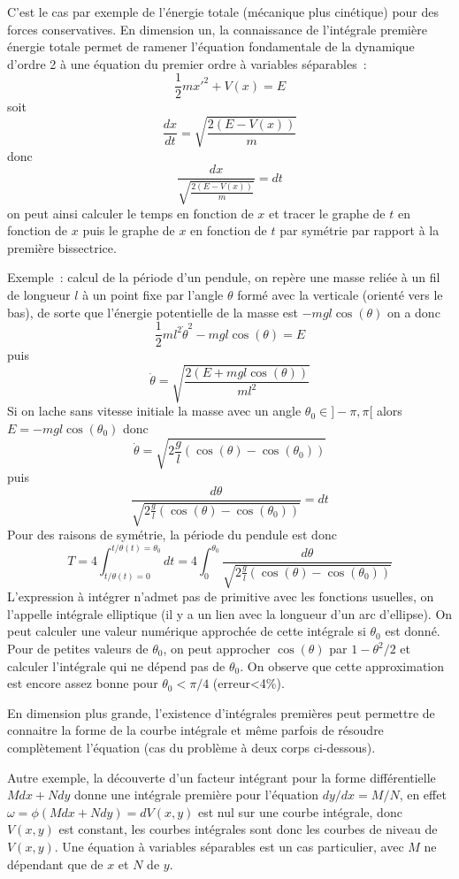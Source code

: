 \documentclass[a4paper,11pt]{article}
\begin{document}
\begin{giacjshere}
C'est le cas par exemple de
l'\'energie totale (m\'ecanique plus cin\'etique) pour des forces
conservatives.  En dimension un, la connaissance de l'int\'egrale 
premi\`ere \'energie
totale permet de ramener l'\'equation fondamentale de la
dynamique d'ordre 2 \`a une \'equation
du premier ordre \`a variables s\'eparables~:
$$ \frac{1}{2} m x'^2+ V(x) = E $$
soit
$$ \frac{dx}{dt} = \sqrt{\frac{2(E-V(x))}{m}}$$
donc 
$$ \frac{dx}{\sqrt{\frac{2(E-V(x))}{m}}}=dt$$
on peut ainsi calculer le temps en fonction de $x$ et tracer
le graphe de $t$ en fonction de $x$ puis le graphe de $x$ en fonction
de $t$  par sym\'etrie
par rapport \`a la premi\`ere bissectrice.

Exemple~: calcul de la p\'eriode d'un pendule, on rep\`ere
une masse reli\'ee \`a un fil de longueur $l$ \`a un point fixe
par l'angle $\theta$ form\'e avec la verticale (orient\'e vers le
bas), de sorte que
l'\'energie potentielle de la masse est $-mgl\cos(\theta)$
on a donc 
$$ \frac{1}{2} m l^2\dot{\theta}^2-mgl\cos(\theta)=E$$
puis
$$ \dot{\theta}=\sqrt{\frac{2(E+mgl\cos(\theta))}{ml^2}}$$
Si on lache sans vitesse initiale la masse avec un angle 
$\theta_0 \in ]-\pi,\pi[$ alors
$E=-mgl\cos(\theta_0)$ donc
$$ \dot{\theta}=\sqrt{2\frac{g}{l}(\cos(\theta)-\cos(\theta_0))}$$
puis
$$ \frac{d\theta}{\sqrt{2\frac{g}{l}(\cos(\theta)-\cos(\theta_0))}}
= dt $$
Pour des raisons de sym\'etrie, la p\'eriode du pendule est donc
$$ T=4\int_{t/\theta(t)=0}^{t/\theta(t)=\theta_0} dt 
=4 \int_0^{\theta_0} \frac{d\theta}{\sqrt{2\frac{g}{l}(\cos(\theta)-\cos(\theta_0))}} $$
L'expression \`a int\'egrer n'admet pas de primitive avec les fonctions
usuelles, on l'appelle int\'egrale elliptique (il y a un lien avec
la longueur d'un arc d'ellipse). On peut calculer une valeur num\'erique
approch\'ee de cette int\'egrale si $\theta_0$ est donn\'e.
Pour de petites valeurs de $\theta_0$, on peut approcher 
$\cos(\theta)$ par $1-\theta^2/2$ et calculer l'int\'egrale
qui ne d\'epend pas de $\theta_0$. On observe que cette approximation 
est encore assez bonne pour $\theta_0<\pi/4$ (erreur<4\%).

En dimension plus grande, l'existence d'int\'egrales
premi\`eres peut permettre de 
connaitre la forme de la courbe int\'egrale et m\^eme
parfois de r\'esoudre compl\`etement l'\'equation (cas du probl\`eme
\`a deux corps ci-dessous).
 
Autre exemple, la d\'ecouverte d'un facteur 
int\'egrant pour la forme diff\'erentielle $Mdx+Ndy$
donne une int\'egrale premi\`ere pour l'\'equation $dy/dx=M/N$,
en effet $\omega=\phi(Mdx+Ndy)=dV(x,y)$ est nul
sur une courbe int\'egrale, donc $V(x,y)$
est constant, les courbes int\'egrales sont donc 
les courbes de niveau de $V(x,y)$. Une \'equation \`a variables
s\'eparables est un cas particulier, avec $M$ ne d\'ependant que de
$x$ et $N$ de $y$.


\end{giacjshere}
\end{document}
